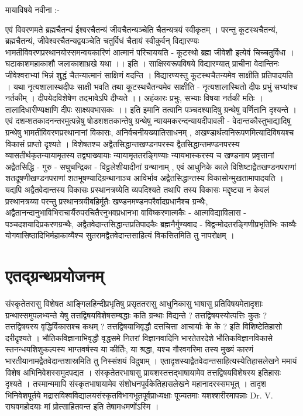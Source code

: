 मायाविषये नवीना  :-

एवं विवरणमते ब्रह्मचैतन्यं ईश्वरचैतन्यं जीवचैतन्यञ्चेति चैतन्यत्रयं स्वीकृतम् । परन्तु कूटस्थचैतन्यं, ब्रह्मचैतन्यं, जीवेश्वरचैतन्यद्वयञ्चेति चतुर्विधं चैतायं स्वीकुर्वन् विद्यारण्यः भामतीविवरणप्रस्थानयोस्समन्वयकारिणं आत्मानं परिचाययति - 
कूटस्थो ब्रह्म जीवेशौ इत्येवं चिच्चतुर्विधा । 
घटाकाशमहाकाशौ जलाकाशाभ्रखे यथा ।। इति । 
साक्षिस्वरूपविषये विद्यारण्यात् प्राचीना वेदान्तिनः जीवेश्वराभ्यां भिन्नं शुद्धं चैतन्यात्मानं साक्षिणं वदन्ति । विद्यारण्यस्तु कूटस्थचैतन्यमेव साक्षीति प्रतिपादयति । यथा नृत्यशालास्थदीपः साक्षी भवति तथा कूटस्थचैतन्यमेव साक्षीति - 
नृत्यशालास्थितो दीपः प्रभुं सभ्यांश्च नर्तकीम् । 
दीपयेदविशेषेण तदभावेऽपि दीप्यते ।।
अहंकारः प्रभुः, सभ्याः विषया नर्तकी मतिः ।
तालादिधारीण्यक्षाणि दीपः साक्ष्यवभासकः ।। इति 
इमानि तत्वानि पञ्चदश्यादिषु ग्रन्थेषु वर्णितानि दृश्यन्ते ।
एवं दशम्शतकादनन्तरमुत्पन्नेषु षोडशशतकान्तेषु ग्रन्थेषु न्यायमकरन्दन्यायदीपावली - वेदान्तकौस्तुभाद्यादिषु ग्रन्थेषु भामतीविवरणप्रस्थानानां विकासः, अनिर्वचनीयख्यातिसाधनम् , अखण्डार्थत्वनिरूपणमित्यादिविषयश्च विकासं प्राप्तो दृश्यते । विशेषतश्च अद्वैतसिद्धान्तखण्डनपरस्य द्वैतसिद्धान्तमण्डनपरस्य व्यासतीर्थकृतन्यायामृतस्य तद्व्याख्यायाः न्यायामृततरङ्गिण्याः न्यायभास्करस्य च खण्डनाय प्रवृत्तानां अद्वैतसिद्धि - गुरु - सघुचन्द्रिका - विट्ठलेशीयादीनां ग्रन्थानाम् , एवं आधुनिके काले विशिष्टाद्वैतखण्डनपराणां शतदूषणीखण्डनपराणां शतभूषण्यादिग्रन्थानाञ्च आविर्भाव अद्वैतसिद्धान्तस्य विकासोन्मुखतामापादयति । 
यद्यपि अद्वैतवेदान्तस्य विकासः प्रस्थानत्रय्येति व्यपदिश्यते तथापि तस्य विकासः मद्दृष्ट्या न केवलं प्रस्थानत्रय्या परन्तु प्रस्थानत्रयीबहिर्मूतैः खण्डनमण्डनपरैर्वादप्रधानैश्च ग्रन्थैः, अद्वैतानन्दानुभाविभिराचार्यैरुपरचितैरनुभवप्रधानभा वाविष्करणात्मकैः - आत्मविद्याविलास - पञ्चदशयादिप्रकरणग्रन्थैः, अद्वैतवेदान्तसिद्धान्तप्रतिपादकैः ब्रह्मनैर्गुण्यवाद - विद्वन्मोदतरङ्गिणीप्रभृतिभिः काव्यैः योगवासिष्ठादिभिर्महाकाव्यैश्च सुतरामद्वैतवेदान्तसाहित्यं विकसितमिति तु नापरोक्षम् । 

\section{एतद्ग्रन्थप्रयोजनम्}
संस्कृतेतरासु विशेषत आङ्गिलहिन्दीप्रभृतिषु प्रसृततरासु आधुनिकासु भाषासु प्रतिविषयमेतादृशाः ग्रन्थास्समुपलभ्यन्ते येषु तत्तद्विषयविशेषसम्बद्धाः कति ग्रन्थाः विद्यन्ते ? तत्तद्विषयस्योत्पत्तिः कुतः ? तत्तद्विषयस्य वृद्धिर्विकासश्च कथम् ? तत्तद्विषयाभिवृद्धौ दत्तचित्ता आचार्याः के के ? इति विशिष्टेतिहासो दरीदृश्यते । भौतिकविज्ञानाभिवृद्धौ वृद्धसमे नितरां विज्ञानवादिनि भारतेतरदेशे भौतिकविज्ञानविकासे स्तनन्धयशिशुकल्पस्य भाग्तवर्षस्य या कीर्तिः, या श्रद्धा,  यश्च गौरवगरिमा तस्य मुख्यं कारणं भारतीयानामद्वैतवेदान्तशास्रमिति तु निस्संशयं विदुषाम् । एतादृशस्याद्वैतवेदान्तसाहित्यस्येतिहासलेखने ममायं विशेष अभिनिवेशस्समुदपद्यत । संस्कृतेतरभाषासु प्रायशस्तत्तद्भाषायामेव तत्तद्विषयविशेषस्य इतिहासः दृश्यते । तस्मान्ममापि संस्कृतभाषायामेव संशोधनपूर्वकेतिहासलेखने महानादरस्समभूत् । तादृश भिनिवेशपूर्तये मद्रासविश्वविद्यालयसंस्कृतविभागभूतपूर्वप्राध्यक्षाः पूज्यतमाः यशश्शरीरमापन्नाः Dr. V. राघवमहोदयाः मां प्रोत्साहितवन्त इति तेषामधमणोंऽस्मि । 

